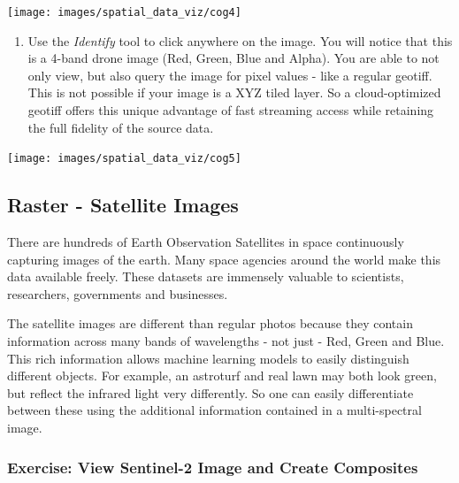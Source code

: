 \documentclass[
  12pt,
  a4paper]{article}
\providecommand{\tightlist}{%
  \setlength{\itemsep}{0pt}\setlength{\parskip}{0pt}}
\begin{document}
\begin{center}\texttt{[image: images/spatial\_data\_viz/cog4]} \end{center}

\begin{enumerate}
\def\labelenumi{\arabic{enumi}.}
\setcounter{enumi}{4}
\tightlist
\item
  Use the \emph{Identify} tool to click anywhere on the image. You will
  notice that this is a 4-band drone image (Red, Green, Blue and Alpha).
  You are able to not only view, but also query the image for pixel
  values - like a regular geotiff. This is not possible if your image is
  a XYZ tiled layer. So a cloud-optimized geotiff offers this unique
  advantage of fast streaming access while retaining the full fidelity
  of the source data.
\end{enumerate}

\begin{center}\texttt{[image: images/spatial\_data\_viz/cog5]} \end{center}

\newpage

\hypertarget{raster---satellite-images}{%
\subsection{Raster - Satellite Images}\label{raster---satellite-images}}

There are hundreds of Earth Observation Satellites in space continuously
capturing images of the earth. Many space agencies around the world make
this data available freely. These datasets are immensely valuable to
scientists, researchers, governments and businesses.

The satellite images are different than regular photos because they
contain information across many bands of wavelengths - not just - Red,
Green and Blue. This rich information allows machine learning models to
easily distinguish different objects. For example, an astroturf and real
lawn may both look green, but reflect the infrared light very
differently. So one can easily differentiate between these using the
additional information contained in a multi-spectral image.

\hypertarget{exercise-view-sentinel-2-image-and-create-composites}{%
\subsubsection{Exercise: View Sentinel-2 Image and Create
Composites}\label{exercise-view-sentinel-2-image-and-create-composites}}
\end{document}
